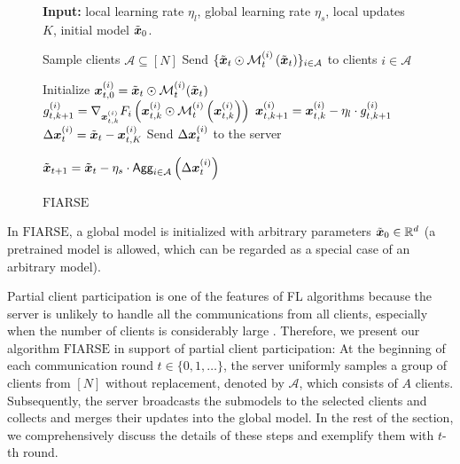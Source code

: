 \documentclass{article}
\renewcommand{\cite}{\citep}
\theoremstyle{plain}
\theoremstyle{definition}
\theoremstyle{remark}
\newcommand{\algo}{\ensuremath{\text{FIARSE}}\xspace}
\newcommand{\bracket}[1]{\left(#1\right)}
\begin{document}
\begin{figure}
\begin{minipage}{0.6\textwidth}
\setlength{\textfloatsep}{0.1cm}
\setlength{\floatsep}{0.1cm}\vspace{-20px}
\begin{algorithm}[H]
\caption{\algo}\label{algo}
\begin{flushleft}
\textbf{Input:} local learning rate $\eta_l$, global learning rate $\eta_s$, local updates $K$, initial model $\x{0}$. 
\end{flushleft}
\begin{algorithmic}[1]
    \State Sample clients $\mathcal{A} \subseteq [N]$
    \State Send $\{\x{t} \odot \mask{i}{t}\bracket{\x{t}}\}_{i \in \mathcal{A}}$ to clients $i \in \mathcal{A}$
    
        \State Initialize $\x{i}{t}{0} = \x{t} \odot \mask{i}{t}(\x{t})$
            \State $\g{i}{t}{k+1} = \nabla_{\x{i}{t}{k}} F_i\bracket{\x{i}{t}{k} \odot \mask{i}{t}\bracket{\x{i}{t}{k}}}$
            \State $\x{i}{t}{k+1} = \x{i}{t}{k} - \eta_l \cdot \g{i}{t}{k+1}$
        \EndFor
        \State $\Delta\x{i}{t} = \x{t} - \x{i}{t}{K}$
        \State Send $\Delta\x{i}{t}$ to the server
    \EndFor

    
    \State $\x{t+1} = \x{t} - \eta_s \cdot \textsf{Agg}_{i\in\mathcal{A}}\bracket{\Delta\x{i}{t}}$
\EndFor
\end{algorithmic}
\end{algorithm}
\setlength{\textfloatsep}{0.1cm}
\setlength{\floatsep}{0.1cm}
\vspace{-30pt}
\end{minipage}
\end{figure}

In \algo, a global model is initialized with arbitrary parameters $\x{0} \in \mathbb{R}^d$ (a pretrained model is allowed, which can be regarded as a special case of an arbitrary model). 

Partial client participation is one of the features of FL algorithms because the server is unlikely to handle all the communications from all clients, especially when the number of clients is considerably large \cite{li2019convergence, yang2020achieving, kairouz2021advances, wu2023anchor, chen2024space}. Therefore, we present our algorithm \algo in support of partial client participation: At the beginning of each communication round $t \in \{0, 1, \dots\}$, the server uniformly samples a group of clients from $[N]$ without replacement, denoted by $\mathcal{A}$, which consists of $A$ clients. Subsequently, the server broadcasts the submodels to the selected clients and collects and merges their updates into the global model. In the rest of the section, we comprehensively discuss the details of these steps and exemplify them with $t$-th round.
\end{document}
